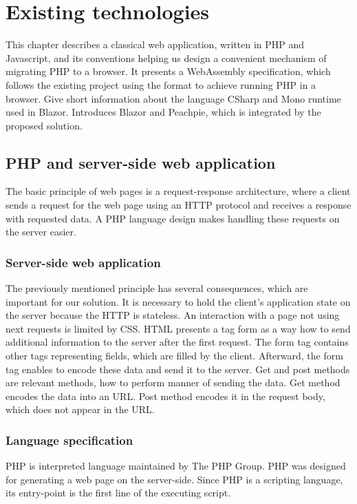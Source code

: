 \chapter{Existing technologies}

This chapter describes a classical web application, written in PHP and Javascript, and its conventions helping us design a convenient mechanism of migrating PHP to a browser.
It presents a WebAssembly specification, which follows the existing project using the format to achieve running PHP in a browser.
Give short information about the language CSharp and Mono runtime used in Blazor.
Introduces Blazor and Peachpie, which is integrated by the proposed solution.

\section{PHP and server-side web application}

The basic principle of web pages is a request-response architecture, where a client sends a request for the web page using an HTTP protocol and receives a response with requested data.
A PHP language design makes handling these requests on the server easier.
 
\subsection{Server-side web application}

The previously mentioned principle has several consequences, which are important for our solution.
It is necessary to hold the client's application state on the server because the HTTP is stateless.
An interaction with a page not using next requests is limited by CSS.
HTML presents a tag form as a way how to send additional information to the server after the first request.
The form tag contains other tags representing fields, which are filled by the client. 
Afterward, the form tag enables to encode these data and send it to the server.
Get and post methods are relevant methods, how to perform manner of sending the data.
Get method encodes the data into an URL.
Post method encodes it in the request body, which does not appear in the URL.

\subsection{Language specification}

PHP  is interpreted language maintained by The PHP Group.
PHP was designed for generating a web page on the server-side.
Since PHP is a scripting language, its entry-point is the first line of the executing script.

